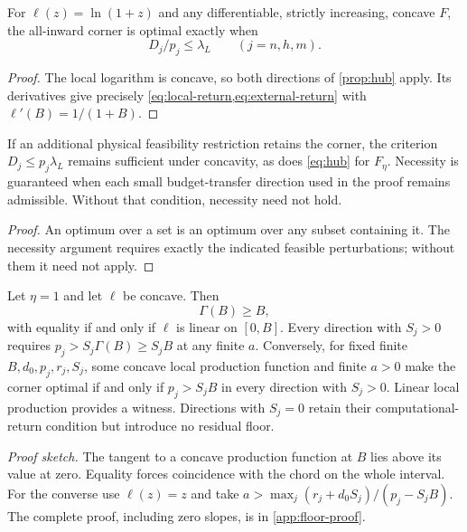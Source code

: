 \begin{corollary}
\label{prop:corner}
For $\ell(z)=\ln(1+z)$ and any differentiable, strictly increasing,
concave $F$, the all-inward corner is optimal exactly when
\begin{equation}
 D_j/p_j\leq\lambda_L\qquad(j=n,h,m).
 \label{eq:corner}
\end{equation}
\end{corollary}
\begin{proof}
The local logarithm is concave, so both directions of
\cref{prop:hub} apply. Its derivatives give precisely
\cref{eq:local-return,eq:external-return} with
$\ell'(B)=1/(1+B)$.
\end{proof}

\begin{corollary}
\label{cor:feasibility}
If an additional physical feasibility restriction retains the corner,
the criterion $D_j\leq p_j\lambda_L$ remains sufficient under
concavity, as does \cref{eq:hub} for $F_\eta$. Necessity is guaranteed
when each small budget-transfer direction used in the proof remains
admissible. Without that condition, necessity need not hold.
\end{corollary}
\begin{proof}
An optimum over a set is an optimum over any subset containing it.
The necessity argument requires exactly the indicated feasible
perturbations; without them it need not apply.
\end{proof}

\begin{productioncorollary}
\label{cor:production-growth}
Let $\eta=1$ and let $\ell$ be concave. Then
\begin{equation}
 \Gamma(B)\geq B,
 \label{eq:tight-floor}
\end{equation}
with equality if and only if $\ell$ is linear on $[0,B]$.
Every direction with $S_j>0$ requires
$p_j>S_j\Gamma(B)\geq S_jB$ at any finite $a$.
Conversely, for fixed finite $B,d_0,p_j,r_j,S_j$, some concave local
production function and finite $a>0$ make the corner optimal if and
only if $p_j>S_jB$ in every direction with $S_j>0$.
Linear local production provides a witness. Directions with $S_j=0$
retain their computational-return condition but introduce no residual
floor.
\end{productioncorollary}
\noindent\emph{Proof sketch.}
The tangent to a concave production function at $B$ lies above its
value at zero. Equality forces coincidence with the chord on the whole
interval. For the converse use $\ell(z)=z$ and take
$a>\max_j(r_j+d_0S_j)/(p_j-S_jB)$.
The complete proof, including zero slopes, is in \cref{app:floor-proof}.

